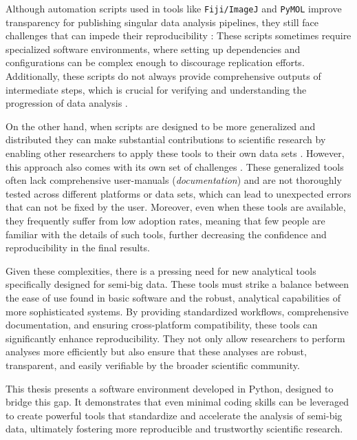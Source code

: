Although automation scripts used in tools like \texttt{Fiji/ImageJ} and
\texttt{PyMOL} improve transparency for publishing singular data analysis
pipelines, they still face challenges that can impede their reproducibility
\cite{pengReproducibleResearchComputational2011, sandveTenSimpleRules2013}:
These scripts sometimes require specialized software environments, where setting
up dependencies and configurations can be complex enough to discourage
replication efforts. Additionally, these scripts do not always provide
comprehensive outputs of intermediate steps, which is crucial for verifying and
understanding the progression of data analysis \cite{sandveTenSimpleRules2013}.

On the other hand, when scripts are designed to be more generalized and
distributed \linebreak{} they can make substantial contributions to
scientific research by enabling other researchers to apply these tools to their
own data sets
\cite{pichlerReusabilityConceptProcess1998,wilkinsonFAIRGuidingPrinciples2016}.
However, this approach also comes with its own set of challenges
\cite{sandveTenSimpleRules2013}. These generalized tools often lack
comprehensive user-manuals (\emph{documentation}) and are not thoroughly tested
across different platforms or data sets, which can lead to unexpected errors
that can not be fixed by the user. Moreover, even when these tools are
available, they frequently suffer from low adoption rates, meaning that few
people are familiar with the details of such tools, further decreasing the
confidence and reproducibility in the final results.

Given these complexities, there is a pressing need for new analytical tools
specifically designed for semi-big data. These tools must strike a balance
between the ease of use found in basic software and the robust, analytical
capabilities of more sophisticated systems. By providing standardized workflows,
comprehensive documentation, and ensuring cross-platform compatibility, these
tools can significantly enhance reproducibility. They not only allow researchers
to perform analyses more efficiently but also ensure that these analyses are
robust, transparent, and easily verifiable by the broader scientific community.

This thesis presents a software environment developed in Python, designed to
bridge this gap. It demonstrates that even minimal coding skills can be
leveraged to create powerful tools that standardize and accelerate the analysis
of semi-big data, ultimately fostering more reproducible and trustworthy
scientific research.







